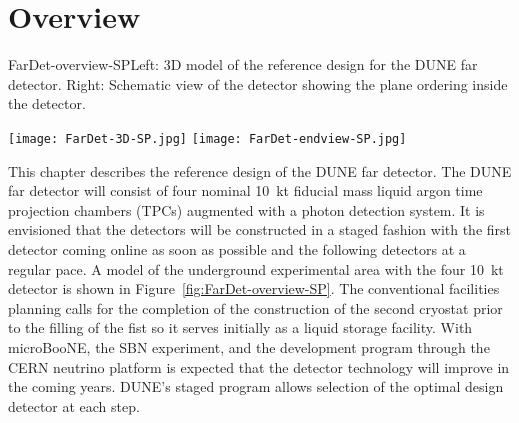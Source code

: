 \section{Overview}
\label{sec:detectors-fd-ref-ov}

\begin{cdrfigure}{FarDet-overview-SP}{Left: 3D model of the reference design for the DUNE far detector. Right: Schematic view of the detector showing the plane ordering inside the detector.}
\centering
\begin{minipage}[b]{1.0\textwidth}
\begin{center}
\texttt{[image: FarDet-3D-SP.jpg]}
\texttt{[image: FarDet-endview-SP.jpg]}
\end{center}
\end{minipage}
\end{cdrfigure}


This chapter describes the reference design of the DUNE far detector. The DUNE far detector will consist of four nominal 10~kt fiducial mass liquid argon time projection chambers (TPCs) augmented with a photon detection system. It is envisioned that the detectors will be constructed in a staged fashion with the first detector coming online as soon as possible and the following detectors at a regular pace. A model of the underground experimental area with the four 10~kt detector is shown in Figure~\ref{fig:FarDet-overview-SP}. The conventional facilities planning calls for the completion of the construction of the second cryostat prior to the filling of the fist so it serves initially as a liquid storage facility. With microBooNE, the SBN experiment, and the development program through the CERN neutrino platform is expected that the detector technology will improve in the coming years. DUNE's staged program allows selection of the optimal design detector at each step. 

